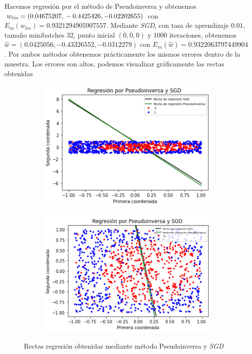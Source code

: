\documentclass[11pt,a4paper]{article}
\theoremstyle{definition}
\begin{document}
	Hacemos regresión por el método de Pseudoinversa y obtenemos $w_{lin}= (0.04675207, \\-0.4425426, -0.02202655)$ con $E_{in}(w_{lin})=0.9321294905907557$. Mediante \textit{SGD}, con tasa de aprendizaje $0.01$, tamaño minibatches 32, punto inicial $(0,0,0)$ y 1000 iteraciones, obtenemos $\hat w = (0.0425056, -0.43326552, -0.0312279)$ con $E_{in}(\hat w)=0.9322063797449904$. Por ambos métodos obtenemos prácticamente los mismos errores dentro de la muestra. Los errores son altos, podemos visualizar gráficamente las rectas obtenidas
	\iffalse
	\begin{figure}[H]
		\centering
		\begin{subfigure}{.488\textwidth}
  		\centering
  		\includegraphics[width=1\textwidth]{images/2_3_c}
  		\label{fig:sub1}
		\end{subfigure}%
		\begin{subfigure}{.512\textwidth}
  		\centering
  		\includegraphics[width=1\textwidth]{images/2_3_c2}
  		\label{fig:sub2}
		\end{subfigure}
		\caption{Rectas regresión obtenidas mediante método Pseudoinversa y \textit{SGD}}
		\label{fig:test}
	\end{figure}
\end{document}
